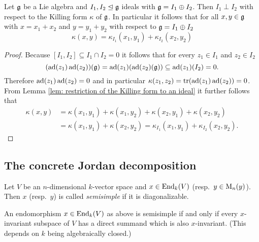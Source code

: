 \begin{lem}\label{lem: orthogonal ideals with respect to the killing form}
 Let $\mathfrak{g}$ be a Lie algebra and $I_1, I_2 \trianglelefteq \mathfrak{g}$ ideals with $\mathfrak{g} = I_1 \oplus I_2$. Then $I_1 \perp I_2$ with respect to the Killing form $\kappa$ of $\mathfrak{g}$. In particular it follows that for all $x,y \in \mathfrak{g}$ with $x = x_1 + x_2$ and $y = y_1 + y_2$ with respect to $\mathfrak{g} = I_1 \oplus I_2$
 \[
  \kappa(x,y) = \kappa_{I_1}(x_1, y_1) + \kappa_{I_2}(x_2, y_2)
 \]
\end{lem}
\begin{proof}
 Because $[I_1, I_2] \subseteq I_1 \cap I_2 = 0$ it follows that for every $z_1 \in I_1$ and $z_2 \in I_2$
 \[
  (\operatorname{ad}(z_1)\operatorname{ad}(z_2))(\mathfrak{g}) = \operatorname{ad}(z_1)(\operatorname{ad}(z_2)(\mathfrak{g})) \subseteq \operatorname{ad}(z_1)(I_2) = 0.
 \]
 Therefore $\operatorname{ad}(z_1)\operatorname{ad}(z_2) = 0$ and in particular $\kappa(z_1,z_2) = \operatorname{tr}(\operatorname{ad}(z_1)\operatorname{ad}(z_2)) = 0$. From Lemma \ref{lem: restriction of the Killing form to an ideal} it further follows that
 \begin{align*}
  \kappa(x,y)
  &= \kappa(x_1, y_1) + \kappa(x_1, y_2) + \kappa(x_2, y_1) + \kappa(x_2, y_2) \\
  &= \kappa(x_1, y_1) + \kappa(x_2, y_2)
  = \kappa_{I_1}(x_1, y_1) + \kappa_{I_2}(x_2, y_2).
 \end{align*}
\end{proof}





\subsection{The concrete Jordan decomposition}


\begin{defi}
 Let $V$ be an $n$-dimensional $k$-vector space and $x \in \operatorname{End}_k(V)$ (resp.\ $y \in \operatorname{M}_n(y)$). Then $x$ (resp.\ $y$) is called \emph{semisimple} if it is diagonalizable.
\end{defi}


\begin{rem}
 An endomorphism $x \in \operatorname{End}_k(V)$ as above is semisimple if and only if every $x$-invariant subspace of $V$ has a direct summand which is also $x$-invariant. (This depends on $k$ being algebraically closed.)
\end{rem}


